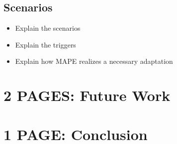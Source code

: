 \documentclass{seal_thesis}
\begin{document}
\section{Scenarios}
\begin{itemize}
	\item Explain the scenarios
	\item Explain the triggers
	\item Explain how MAPE realizes a necessary adaptation
\end{itemize}


\chapter{2 PAGES: Future Work}



\chapter{1 PAGE: Conclusion}





\end{document}
